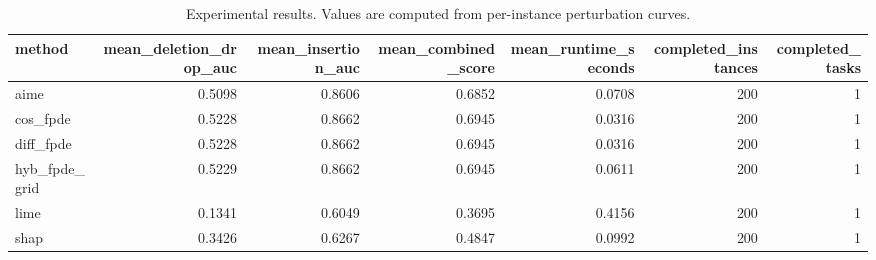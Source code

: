\begin{table}[t]
\caption{Experimental results. Values are computed from per-instance perturbation curves.}
\label{tab:main_results_computed}
\centering
\begin{tabular}{lrrrrrr}
\toprule
method & mean\_deletion\_drop\_auc & mean\_insertion\_auc & mean\_combined\_score & mean\_runtime\_seconds & completed\_instances & completed\_tasks \\
\midrule
aime & 0.5098 & 0.8606 & 0.6852 & 0.0708 & 200 & 1 \\
cos\_fpde & 0.5228 & 0.8662 & 0.6945 & 0.0316 & 200 & 1 \\
diff\_fpde & 0.5228 & 0.8662 & 0.6945 & 0.0316 & 200 & 1 \\
hyb\_fpde\_grid & 0.5229 & 0.8662 & 0.6945 & 0.0611 & 200 & 1 \\
lime & 0.1341 & 0.6049 & 0.3695 & 0.4156 & 200 & 1 \\
shap & 0.3426 & 0.6267 & 0.4847 & 0.0992 & 200 & 1 \\
\bottomrule
\end{tabular}

\end{table}
